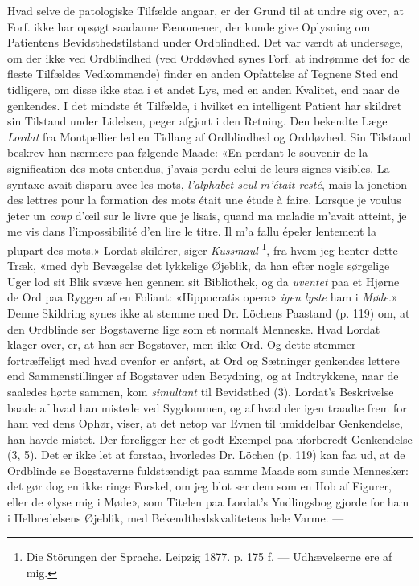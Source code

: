 \documentclass[12pt,a4paper,openany]{book}
\newcommand{\opage}[1]{\marginnote{\footnotesize\textit{[#1]}}}
\begin{document}
Hvad selve de patologiske Tilfælde angaar, er der Grund til at undre sig over,
at Forf. ikke har opsøgt saadanne Fænomener, der kunde give Oplysning om
Patientens Bevidsthedstilstand under Ordblindhed. Det var værdt at undersøge,
om der ikke ved Ordblindhed (ved Orddøvhed synes Forf. at indrømme det for de
fleste Tilfældes Vedkommende) finder en anden Opfattelse af Tegnene Sted end
tidligere, om disse ikke staa i et andet Lys, med en anden Kvalitet, end naar
de genkendes. I det mindste ét Tilfælde, i hvilket en intelligent Patient har
skildret sin Tilstand under Lidelsen, peger afgjort i den Retning. Den bekendte
Læge \emph{Lordat} fra Montpellier led en Tidlang af Ordblindhed og Orddøvhed.
Sin Tilstand beskrev han nærmere paa følgende Maade: «En perdant le souvenir de
la signification des mots entendus, j'avais perdu celui de leurs signes
visibles. La syntaxe avait disparu avec les mots, \emph{l'alphabet seul m'était
resté}, mais la jonction des lettres pour la formation des mots était une étude
à faire. Lorsque je voulus jeter un \emph{coup} d'œil sur le livre que je
lisais, quand ma maladie m'avait atteint, je me vis dans l'impossibilité d'en
lire le titre. Il m'a fallu épeler lentement la plupart des mots.» Lordat
skildrer, siger \emph{Kussmaul}%
\footnote[1]{Die Störungen der Sprache. Leipzig 1877. p. 175 f. ---
Udhævelserne ere af mig.}, fra hvem jeg henter dette Træk, «med dyb Bevægelse
\setcounter{footnote}{0}%
\opage{28}det lykkelige Øjeblik, da han efter nogle sørgelige Uger lod sit Blik
svæve hen gennem sit Bibliothek, og da \emph{uventet} paa et Hjørne de Ord paa
Ryggen af en Foliant: «Hippocratis opera» \emph{igen lyste} ham i \emph{Møde}.»
Denne Skildring synes ikke at stemme med Dr. Löchens Paastand (p. 119) om, at
den Ordblinde ser Bogstaverne lige som et normalt Menneske. Hvad Lordat klager
over, er, at han ser Bogstaver, men ikke Ord. Og dette stemmer fortræffeligt
med hvad ovenfor er anført, at Ord og Sætninger genkendes lettere end
Sammenstillinger af Bogstaver uden Betydning, og at Indtrykkene, naar de
saaledes hørte sammen, kom \emph{simultant} til Bevidsthed (3). Lordat's
Beskrivelse baade af hvad han mistede ved Sygdommen, og af hvad der igen
traadte frem for ham ved dens Ophør, viser, at det netop var Evnen til
umiddelbar Genkendelse, han havde mistet. Der foreligger her et godt Exempel
paa uforberedt Genkendelse (3, 5). Det er ikke let at forstaa, hvorledes Dr.
Löchen (p. 119) kan faa ud, at de Ordblinde se Bogstaverne fuldstændigt paa
samme Maade som sunde Mennesker: det gør dog en ikke ringe Forskel, om jeg blot
ser dem som en Hob af Figurer, eller de «lyse mig i Møde», som Titelen paa
Lordat's Yndlingsbog gjorde for ham i Helbredelsens Øjeblik, med
Bekendthedskvalitetens hele Varme. ---
\end{document}
